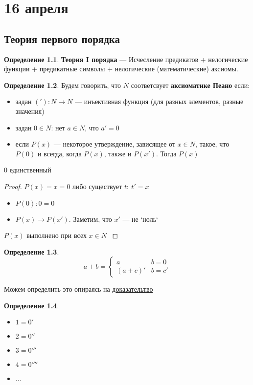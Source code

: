 \documentclass[oneside]{book}
\newcounter{propertycnt}
\newcommand{\beginproperty}{\setcounter{propertycnt}{1}}
\theoremstyle{plain}
\newenvironment{property}{
  \renewcommand\thepropertyinner{\arabic{propertycnt}}
  \propertyinner
}{\endpropertyinner\stepcounter{propertycnt}}
\theoremstyle{remark}
\theoremstyle{definition}
\newtheorem*{definition}{Определение}
\begin{document}
\chapter{16 апреля}
\label{sec:orgbfaacc2}
\section{Теория первого порядка}
\label{sec:org16f700e}
\begin{definition}
\textbf{Теория I порядка} --- Исчесление предикатов + нелогические функции + предикатные символы + нелогические (математические) аксиомы.
\label{orgb199f63}
\end{definition}
\begin{definition}
Будем говорить, что \(N\) соответсвует \textbf{аксиоматике Пеано} если:
\begin{itemize}
\item задан \(('): N \to N\) --- инъективная функция (для разных элементов, разные значения)
\item задан \(0 \in N\): нет \(a \in N\), что \(a' = 0\)
\item если \(P(x)\) --- некоторое утверждение, зависящее от \(x \in N\), такое, что \(P(0)\) и всегда, когда \(P(x)\), также и \(P(x')\). Тогда \(P(x)\)
\end{itemize}
\label{org7afb38b}
\end{definition}
\beginproperty
\begin{property}
\(0\) единственный
\label{org740e30d}
\end{property}
\begin{proof}
\(P(x)=x = 0\) либо существует \(t:\ t' = x\)
\begin{itemize}
\item \(P(0): 0 = 0\)
\item \(P(x) \to P(x')\). Заметим, что \(x'\) --- не `ноль`
\end{itemize}
\(P(x)\) выполнено при всех \(x \in N\)
\label{org5d84e63}
\end{proof}
\begin{definition}
\[ a + b = \begin{cases}
a & b = 0 \\
(a + c)' & b = c'
\end{cases}\]
\label{org55c61b4}
\end{definition}
Можем определить это опираясь на \hyperref[org5d84e63]{доказательтво}
\begin{definition}
\begin{itemize}
\item \(1 = 0'\)
\item \(2 = 0''\)
\item \(3 = 0'''\)
\item \(4 = 0''''\)
\item \(\dots\)
\end{itemize}
\end{definition}
\end{document}
